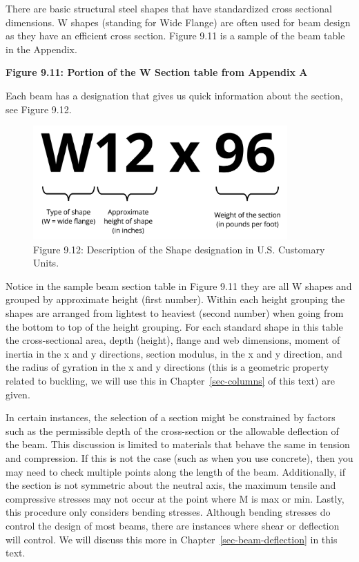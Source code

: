 \documentclass[
  letterpaper,
  DIV=11,
  numbers=noendperiod]{scrreprt}
\theoremstyle{definition}
\theoremstyle{remark}
\begin{document}
There are basic structural steel shapes that have standardized cross
sectional dimensions. W shapes (standing for Wide Flange) are often used
for beam design as they have an efficient cross section. Figure 9.11 is
a sample of the beam table in the Appendix.

\textbf{Figure 9.11: Portion of the W Section table from Appendix A}

Each beam has a designation that gives us quick information about the
section, see Figure 9.12.

\begin{figure}[H]

{\centering \includegraphics[width=3.83333in,height=\textheight]{images/CH9 PNGs/Figure 9.12.png}

}

\caption{Figure 9.12: Description of the Shape designation in U.S.
Customary Units.}

\end{figure}%

Notice in the sample beam section table in Figure 9.11 they are all W
shapes and grouped by approximate height (first number). Within each
height grouping the shapes are arranged from lightest to heaviest
(second number) when going from the bottom to top of the height
grouping. For each standard shape in this table the cross-sectional
area, depth (height), flange and web dimensions, moment of inertia in
the x and y directions, section modulus, in the x and y direction, and
the radius of gyration in the x and y directions (this is a geometric
property related to buckling, we will use this in
Chapter~\ref{sec-columns} of this text) are given.

In certain instances, the selection of a section might be constrained by
factors such as the permissible depth of the cross-section or the
allowable deflection of the beam. This discussion is limited to
materials that behave the same in tension and compression. If this is
not the case (such as when you use concrete), then you may need to check
multiple points along the length of the beam. Additionally, if the
section is not symmetric about the neutral axis, the maximum tensile and
compressive stresses may not occur at the point where M is max or min.
Lastly, this procedure only considers bending stresses. Although bending
stresses do control the design of most beams, there are instances where
shear or deflection will control. We will discuss this more in
Chapter~\ref{sec-beam-deflection} in this text.
\end{document}
